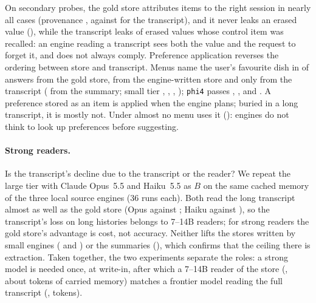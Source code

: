 On secondary probes, the gold store attributes items to the right session in nearly all cases
(provenance , against  for the transcript),
and it never leaks an erased value (), while the transcript leaks
 of erased values whose control item was recalled: an engine reading a
transcript sees both the value and the request to forget it, and does not always comply.
Preference application reverses the \PFM ordering between store and transcript. Menus name the
user's favourite dish in  of answers from the gold store,
 from the engine-written store and only  from the transcript
( from the summary; small tier , ,
, ); \texttt{phi4} passes ,
,  and . A preference stored as an item is
applied when the engine plans; buried in a long transcript, it is mostly not. Under  almost
no menu uses it (): engines do not think to look up preferences before
suggesting.

\paragraph{Strong readers.} Is the transcript's decline due to the transcript or the reader? We
repeat the large tier with Claude Opus~5.5 and Haiku~5.5 as $B$ on the same cached memory of the
three local source engines (36 runs each). Both read the long transcript almost as well as the gold store (Opus
 against ; Haiku
 against ), so the transcript's
loss on long histories belongs to 7--14B readers; for strong readers the gold store's advantage is
cost, not accuracy. Neither lifts the stores written by small engines
( and ) or the summaries
(), which confirms that the ceiling there is extraction. Taken
together, the two experiments separate the roles: a strong model is needed once, at write-in,
after which a 7--14B reader of the store (, about
 tokens of carried memory) matches a frontier model reading the full
transcript (,  tokens).

